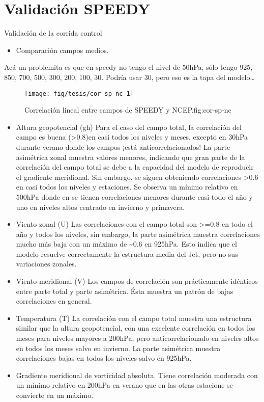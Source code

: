 \documentclass[spanish,a4paper]{book}
\providecommand{\tightlist}{%
  \setlength{\itemsep}{0pt}\setlength{\parskip}{0pt}}
\begin{document}
\section{Validación SPEEDY}\label{validacion-speedy}

Validación de la corrida control

\begin{itemize}
\tightlist
\item
  Comparación campos medios.
\end{itemize}

Acá un problemita es que en speedy no tengo el nivel de 50hPa, sólo
tengo 925, 850, 700, 500, 300, 200, 100, 30. Podría usar 30, pero eso es
la tapa del modelo\ldots{}

\begin{figure}
\texttt{[image: fig/tesis/cor-sp-nc-1]} \caption{Correlación lineal entre campos de SPEEDY y NCEP.{fig:cor-sp-nc}}\label{fig:cor-sp-nc}
\end{figure}

\begin{itemize}
\item
  Altura geopotencial (gh) Para el caso del campo total, la correlación
  del campo es buena (\textgreater{}0.8)en casi todos los niveles y
  meses, excepto en 30hPa durante verano donde los campos ¡está
  anticorrelacionados! La parte asimétrica zonal muestra valores
  menores, indicando que gran parte de la correlación del campo total se
  debe a la capacidad del modelo de reproducir el gradiente meridional.
  Sin embargo, se siguen obteniendo correlaciones \textgreater{}0.6 en
  casi todos los niveles y estaciones. Se observa un mínimo relativo en
  500hPa donde en se tienen correlaciones menores durante casi todo el
  año y uno en niveles altos centrado en invierno y primavera.
\item
  Viento zonal (U) Las correlaciones con el campo total son
  \textgreater{}=0.8 en todo el año y todos los niveles, sin embargo, la
  parte asimétrica muestra correlaciones mucho más baja con un máximo de
  \textasciitilde{}0.6 en 925hPa. Esto indica que el modelo resuelve
  correctamente la estructura media del Jet, pero no sus variaciones
  zonales.
\item
  Viento meridional (V) Los campos de correlación son prácticamente
  idénticos entre parte total y parte asimétrica. Ésta muestra un patrón
  de bajas correlaciones en general.
\item
  Temperatura (T) La correlación con el campo total muestra una
  estructura similar que la altura geopotencial, con una excelente
  correlación en todos los meses para niveles mayores a 200hPa, pero
  anticorrelacionado en niveles altos en todos los meses salvo en
  invierno. La parte asimétrica muestra correlaciones bajas en todos los
  niveles salvo en 925hPa.
\item
  Gradiente meridional de vorticidad absoluta. Tiene correlación
  moderada con un mínimo relativo en 200hPa en verano que en las otras
  estacione se convierte en un máximo.
\end{itemize}
\end{document}
